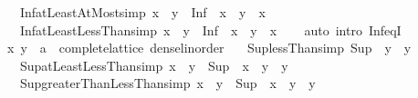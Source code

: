 \begin{isabellebody}
\ \ \ \ \ Inf{\isacharunderscore}{\kern0pt}atLeastAtMost{\isacharbrackleft}{\kern0pt}simp{\isacharbrackright}{\kern0pt}{\isacharcolon}{\kern0pt}\ {\isachardoublequoteopen}x\ {\isasymle}\ y\ {\isasymLongrightarrow}\ Inf\ {\isacharbraceleft}{\kern0pt}\ x\ {\isachardot}{\kern0pt}{\isachardot}{\kern0pt}\ y{\isacharbraceright}{\kern0pt}\ {\isacharequal}{\kern0pt}\ x{\isachardoublequoteclose}\isanewline
\ \ \ \ \ Inf{\isacharunderscore}{\kern0pt}atLeastLessThan{\isacharbrackleft}{\kern0pt}simp{\isacharbrackright}{\kern0pt}{\isacharcolon}{\kern0pt}\ {\isachardoublequoteopen}x\ {\isacharless}{\kern0pt}\ y\ {\isasymLongrightarrow}\ Inf\ {\isacharbraceleft}{\kern0pt}\ x\ {\isachardot}{\kern0pt}{\isachardot}{\kern0pt}{\isacharless}{\kern0pt}\ y{\isacharbraceright}{\kern0pt}\ {\isacharequal}{\kern0pt}\ x{\isachardoublequoteclose}\isanewline
%
\isadelimproof
\ \ %
\endisadelimproof
%
\isatagproof
{}\isamarkupfalse%
\ {\isacharparenleft}{\kern0pt}auto\ intro{\isacharbang}{\kern0pt}{\isacharcolon}{\kern0pt}\ Inf{\isacharunderscore}{\kern0pt}eqI{\isacharparenright}{\kern0pt}%
\endisatagproof
{\isafoldproof}%
%
\isadelimproof
\isanewline
%
\endisadelimproof
\isanewline
{}\isamarkupfalse%
\isanewline
\isanewline
{}\isamarkupfalse%
\isanewline
\ \ \ x\ y\ {\isacharcolon}{\kern0pt}{\isacharcolon}{\kern0pt}\ {\isachardoublequoteopen}{\isacharprime}{\kern0pt}a\ {\isacharcolon}{\kern0pt}{\isacharcolon}{\kern0pt}\ {\isacharbraceleft}{\kern0pt}complete{\isacharunderscore}{\kern0pt}lattice{\isacharcomma}{\kern0pt}\ dense{\isacharunderscore}{\kern0pt}linorder{\isacharbraceright}{\kern0pt}{\isachardoublequoteclose}\isanewline
\ \ \ Sup{\isacharunderscore}{\kern0pt}lessThan{\isacharbrackleft}{\kern0pt}simp{\isacharbrackright}{\kern0pt}{\isacharcolon}{\kern0pt}\ {\isachardoublequoteopen}Sup\ {\isacharbraceleft}{\kern0pt}{\isachardot}{\kern0pt}{\isachardot}{\kern0pt}{\isacharless}{\kern0pt}\ y{\isacharbraceright}{\kern0pt}\ {\isacharequal}{\kern0pt}\ y{\isachardoublequoteclose}\isanewline
\ \ \ \ \ Sup{\isacharunderscore}{\kern0pt}atLeastLessThan{\isacharbrackleft}{\kern0pt}simp{\isacharbrackright}{\kern0pt}{\isacharcolon}{\kern0pt}\ {\isachardoublequoteopen}x\ {\isacharless}{\kern0pt}\ y\ {\isasymLongrightarrow}\ Sup\ {\isacharbraceleft}{\kern0pt}\ x\ {\isachardot}{\kern0pt}{\isachardot}{\kern0pt}{\isacharless}{\kern0pt}\ y{\isacharbraceright}{\kern0pt}\ {\isacharequal}{\kern0pt}\ y{\isachardoublequoteclose}\isanewline
\ \ \ \ \ Sup{\isacharunderscore}{\kern0pt}greaterThanLessThan{\isacharbrackleft}{\kern0pt}simp{\isacharbrackright}{\kern0pt}{\isacharcolon}{\kern0pt}\ {\isachardoublequoteopen}x\ {\isacharless}{\kern0pt}\ y\ {\isasymLongrightarrow}\ Sup\ {\isacharbraceleft}{\kern0pt}\ x\ {\isacharless}{\kern0pt}{\isachardot}{\kern0pt}{\isachardot}{\kern0pt}{\isacharless}{\kern0pt}\ y{\isacharbraceright}{\kern0pt}\ {\isacharequal}{\kern0pt}\ y{\isachardoublequoteclose}\isanewline

\end{isabellebody}
